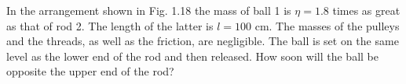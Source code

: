 \item In the arrangement shown in Fig. 1.18 the mass of ball 1 is \(\eta = 1.8\) times as great as that of rod 2. The length of the latter is \(l = 100\) cm. The masses of the pulleys and the threads, as well as the friction, are negligible. The ball is set on the same level as the lower end of the rod and then released. How soon will the ball be opposite the upper end of the rod?
    \begin{center}
    \end{center}
\begin{solution}
    \begin{center}
    \end{center}

\end{solution}
